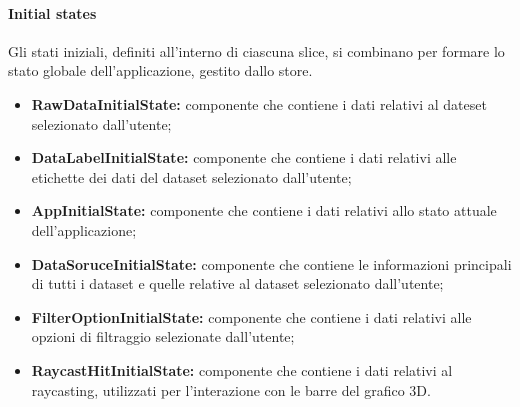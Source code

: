 \paragraph{Initial states}
    Gli stati iniziali, definiti all'interno di ciascuna slice, si combinano per formare lo stato globale dell'applicazione, gestito dallo store.
    \begin{itemize}
        \item \textbf{RawDataInitialState:} componente che contiene i dati relativi al dateset selezionato dall'utente;
        \item \textbf{DataLabelInitialState:} componente che contiene i dati relativi alle etichette dei dati del dataset selezionato dall'utente;
        \item \textbf{AppInitialState:} componente che contiene i dati relativi allo stato attuale dell'applicazione;
        \item \textbf{DataSoruceInitialState:} componente che contiene le informazioni principali di tutti i dataset e quelle relative al dataset selezionato dall'utente;
        \item \textbf{FilterOptionInitialState:} componente che contiene i dati relativi alle opzioni di filtraggio selezionate dall'utente;
        \item \textbf{RaycastHitInitialState:} componente che contiene i dati relativi al raycasting, utilizzati per l'interazione con le barre del grafico 3D.
    \end{itemize}
